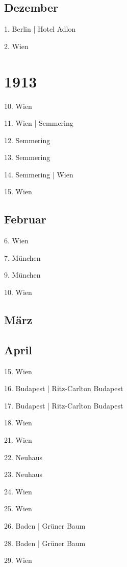 \documentclass[twoside=false,titlepage=false,open=any, parskip=never, fontsize=10pt, headings=small, chapterprefix=false, appendixprefix=false, DIV=15]{scrbook}
\begin{document}
\begin{multicols}{3}
            \section*{Dezember}
            1. Berlin | Hotel Adlon\par
            2. Wien\par
            \chapter*{1913}
            10. Wien\par
            11. Wien | Semmering\par
            12. Semmering\par
            13. Semmering\par
            14. Semmering | Wien\par
            15. Wien\par
            \section*{Februar}
            6. Wien\par
            7. München\par
            9. München\par
            10. Wien\par
            \section*{März}
            \section*{April}
            15. Wien\par
            16. Budapest | Ritz-Carlton Budapest\par
            17. Budapest | Ritz-Carlton Budapest\par
            18. Wien\par
            21. Wien\par
            22. Neuhaus\par
            23. Neuhaus\par
            24. Wien\par
            25. Wien\par
            26. Baden | Grüner Baum\par
            28. Baden | Grüner Baum\par
            29. Wien\par

\end{multicols}
\end{document}
